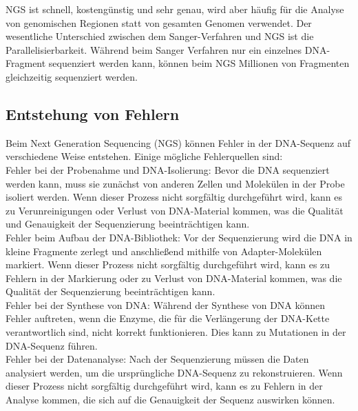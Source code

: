 \documentclass[oneside,bibliography=totocnumbered,BCOR=5mm]{scrbook}%
\theoremstyle{definition}
\theoremstyle{definition}
\theoremstyle{definition}
\theoremstyle{definition}
\theoremstyle{definition}
\theoremstyle{definition}
\begin{document}
NGS ist schnell, kostengünstig und sehr genau, 
wird aber häufig für die Analyse von genomischen Regionen statt von gesamten Genomen verwendet.
Der wesentliche Unterschied zwischen dem Sanger-Verfahren und NGS ist die Parallelisierbarkeit. 
Während beim Sanger Verfahren nur ein einzelnes DNA-Fragment sequenziert werden kann, 
können beim NGS Millionen von Fragmenten gleichzeitig sequenziert werden.  \\
\linebreak[4]


\subsection{Entstehung von Fehlern}


Beim Next Generation Sequencing (NGS) können Fehler in der DNA-Sequenz auf verschiedene Weise entstehen. 
Einige mögliche Fehlerquellen sind:  \\


Fehler bei der Probenahme und DNA-Isolierung: Bevor die DNA sequenziert werden kann, 
muss sie zunächst von anderen Zellen und Molekülen in der Probe isoliert werden. 
Wenn dieser Prozess nicht sorgfältig durchgeführt wird, kann es zu Verunreinigungen oder Verlust von 
DNA-Material kommen, was die Qualität und Genauigkeit der Sequenzierung beeinträchtigen kann.  \\


Fehler beim Aufbau der DNA-Bibliothek: Vor der Sequenzierung wird die DNA in kleine Fragmente zerlegt und 
anschließend mithilfe von Adapter-Molekülen markiert. Wenn dieser Prozess nicht sorgfältig durchgeführt wird, 
kann es zu Fehlern in der Markierung oder zu Verlust von DNA-Material kommen, 
was die Qualität der Sequenzierung beeinträchtigen kann.  \\


Fehler bei der Synthese von DNA: Während der Synthese von DNA können Fehler auftreten, 
wenn die Enzyme, die für die Verlängerung der DNA-Kette verantwortlich sind, nicht korrekt funktionieren. 
Dies kann zu Mutationen in der DNA-Sequenz führen. \\


Fehler bei der Datenanalyse: Nach der Sequenzierung müssen die Daten analysiert werden, 
um die ursprüngliche DNA-Sequenz zu rekonstruieren. Wenn dieser Prozess nicht sorgfältig durchgeführt wird, 
kann es zu Fehlern in der Analyse kommen, die sich auf die Genauigkeit der Sequenz auswirken können. \\
\end{document}
